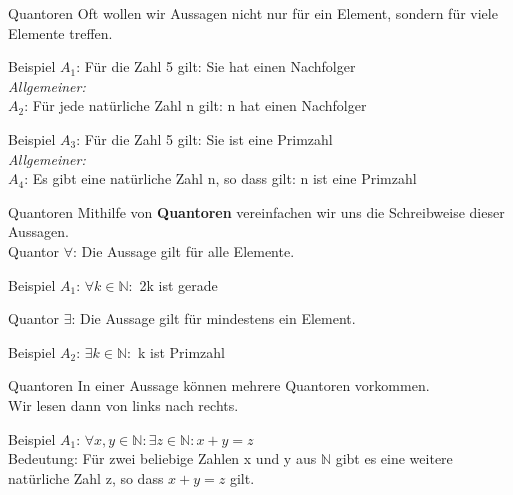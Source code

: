 \documentclass[10pt]{beamer}
\begin{document}
\begin{frame}[fragile]{Quantoren}
    Oft wollen wir Aussagen nicht nur für ein Element, sondern für viele Elemente treffen.
    \begin{exampleblock}{Beispiel}
        $A_1$: Für die Zahl 5 gilt: Sie hat einen Nachfolger\\
        \emph{Allgemeiner:}\\
        $A_2$: Für jede natürliche Zahl n gilt: n hat einen Nachfolger
    \end{exampleblock}
    \begin{exampleblock}{Beispiel}
        $A_3$: Für die Zahl 5 gilt: Sie ist eine Primzahl\\
        \emph{Allgemeiner:}\\
        $A_4$: Es gibt eine natürliche Zahl n, so dass gilt: n ist eine Primzahl
    \end{exampleblock}
\end{frame}

\begin{frame}[fragile]{Quantoren}
    Mithilfe von \textbf{Quantoren} vereinfachen wir uns die Schreibweise dieser Aussagen.\\
    \vspace{0.5cm}
    Quantor \alert{$\forall$}: Die Aussage gilt für alle Elemente.\\
    \begin{exampleblock}{Beispiel}
        $A_1$: $\forall k \in \mathbb{N}:$ 2k ist gerade
    \end{exampleblock}
    Quantor \alert{$\exists$}: Die Aussage gilt für mindestens ein Element.\\
    \begin{exampleblock}{Beispiel}
        $A_2$: $\exists k \in \mathbb{N}:$ k ist Primzahl
    \end{exampleblock}
\end{frame}

\begin{frame}[fragile]{Quantoren}
    In einer Aussage können mehrere Quantoren vorkommen.\\
    Wir lesen dann von links nach rechts.
    \begin{exampleblock}{Beispiel}
        $A_1$: $\forall x,y \in \mathbb{N}: \exists z \in \mathbb{N}: x+y = z$\\
        Bedeutung: Für zwei beliebige Zahlen x und y aus $\mathbb{N}$ gibt es eine weitere natürliche Zahl z, so dass $x+y=z$ gilt.
    \end{exampleblock}
\end{frame}
\end{document}
